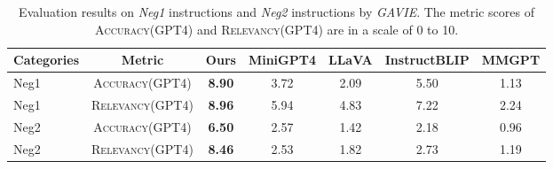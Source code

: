 


\begin{table}[t]
\setlength\tabcolsep{3pt}
\centering
\small
\begin{tabular}{lcccccc}
\toprule[1.5pt]
Categories& Metric&Ours & MiniGPT4 & LLaVA & InstructBLIP & MMGPT\\
\midrule
Neg1 & \textsc{Accuracy(GPT4)} & \textbf{8.90} & 3.72 & 2.09 & 5.50 & 1.13\\
Neg1 & \textsc{Relevancy(GPT4)} & \textbf{8.96} & 5.94 & 4.83 & 7.22 & 2.24\\
\midrule
Neg2 & \textsc{Accuracy(GPT4)} & \textbf{6.50} & 2.57 & 1.42 & 2.18 & 0.96\\
Neg2 & \textsc{Relevancy(GPT4)} & \textbf{8.46} & 2.53 & 1.82 & 2.73 & 1.19\\
\bottomrule[1.5pt]
\end{tabular}
\vspace{0.05in}
\caption{
Evaluation results on \textit{Neg1} instructions and \textit{Neg2} instructions by \textit{GAVIE}. The metric scores of \textsc{Accuracy(GPT4)} and \textsc{Relevancy(GPT4)} are in a scale of 0 to 10.}
\label{tab:neg1neg2}
\vspace{-0.1in}
\end{table}


